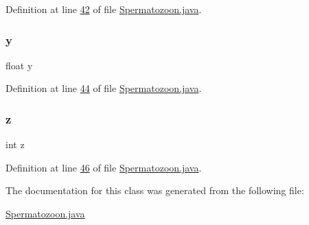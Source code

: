 Definition at line \hyperlink{_spermatozoon_8java_source_l00042}{42} of file \hyperlink{_spermatozoon_8java_source}{Spermatozoon.\+java}.

\hypertarget{classdata_1_1_spermatozoon_aa4f0d3eebc3c443f9be81bf48561a217}{}\label{classdata_1_1_spermatozoon_aa4f0d3eebc3c443f9be81bf48561a217} 
\subsubsection{\texorpdfstring{y}{y}}
{\footnotesize\ttfamily float y}



Definition at line \hyperlink{_spermatozoon_8java_source_l00044}{44} of file \hyperlink{_spermatozoon_8java_source}{Spermatozoon.\+java}.

\hypertarget{classdata_1_1_spermatozoon_a14f94e529dff0b8bfba8e16fbe9755d6}{}\label{classdata_1_1_spermatozoon_a14f94e529dff0b8bfba8e16fbe9755d6} 
\subsubsection{\texorpdfstring{z}{z}}
{\footnotesize\ttfamily int z}



Definition at line \hyperlink{_spermatozoon_8java_source_l00046}{46} of file \hyperlink{_spermatozoon_8java_source}{Spermatozoon.\+java}.



The documentation for this class was generated from the following file\+:\begin{DoxyCompactItemize}
\item 
\hyperlink{_spermatozoon_8java}{Spermatozoon.\+java}\end{DoxyCompactItemize}
